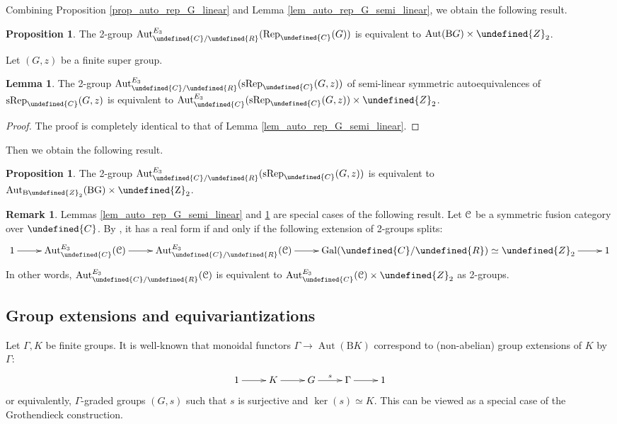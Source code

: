 \documentclass[10pt]{article}
\let\mathbb\undefined
\theoremstyle{definition}
\newtheorem{prop}[thm]{Proposition}
\newtheorem{lem}[thm]{Lemma}
\newtheorem{rem}[thm]{Remark}
\numberwithin{equation}{section}
\numberwithin{thm}{section}
\newcommand{\pf}{\begin{proof}}
\newcommand{\epf}{\end{proof}}
\newcommand{\Cb}{\mathbb{C}}
\newcommand{\Rb}{\mathbb{R}}
\newcommand{\Zb}{\mathbb{Z}}
\newcommand{\CC}{\EuScript{C}}
\newcommand{\rmB}{\mathrm{B}}
\DeclareMathOperator{\Aut}{Aut}
\DeclareMathOperator{\Gal}{Gal}
\newcommand{\rep}{\mathrm{Rep}}
\newcommand{\srep}{\mathrm{sRep}}
\begin{document}
Combining Proposition \ref{prop_auto_rep_G_linear} and Lemma \ref{lem_auto_rep_G_semi_linear}, we obtain the following result.

\begin{prop} \label{prop_auto_rep_G_semi_linear}
The 2-group $\Aut_{\Cb/\Rb}^{E_3}(\rep_\Cb(G))$ is equivalent to $\Aut(\rmB G) \times \Zb_2$.
\end{prop}


Let $(G,z)$ be a finite super group.

\begin{lem} \label{lem_auto_srep_G_z_semi_linear}
The 2-group $\Aut_{\Cb/\Rb}^{E_3}(\srep_\Cb(G,z))$ of semi-linear symmetric autoequivalences of $\srep_\Cb(G,z)$ is equivalent to $\Aut_\Cb^{E_3}(\srep_\Cb(G,z)) \times \Zb_2$.
\end{lem}

\pf
The proof is completely identical to that of Lemma \ref{lem_auto_rep_G_semi_linear}.
\epf

Then we obtain the following result.

\begin{prop} \label{prop_auto_srep_G_z_semi_linear}
The 2-group $\Aut_{\Cb/\Rb}^{E_3}(\srep_\Cb(G,z))$ is equivalent to $\Aut_{\rmB \Zb_2}(\rm B G) \times \Zb_2$.
\end{prop}

\begin{rem}
Lemmas \ref{lem_auto_rep_G_semi_linear} and  \ref{lem_auto_srep_G_z_semi_linear} are special cases of the following result. Let $\CC$ be a symmetric fusion category over $\Cb$. By \cite[Proposition 3.5]{EG11}, it has a real form if and only if the following extension of 2-groups splits:
\[
\xymatrix{
1 \ar[r] & \Aut^{E_3}_\Cb(\CC) \ar[r] & \Aut^{E_3}_{\Cb/\Rb}(\CC) \ar[r] & \Gal(\Cb/\Rb) \simeq \Zb_2 \ar[r] & 1
}
\]
In other words, $\Aut^{E_3}_{\Cb/\Rb}(\CC)$ is equivalent to $\Aut^{E_3}_\Cb(\CC) \times \Zb_2$ as 2-groups.
\end{rem}

\subsection{Group extensions and equivariantizations} \label{sec_extension_equivariantization}

Let $\Gamma,K$ be finite groups. It is well-known that monoidal functors $\Gamma \to \Aut(\rmB K)$ correspond to (non-abelian) group extensions of $K$ by $\Gamma$:
\[
\xymatrix{
1 \ar[r] & K \ar[r] & G \ar[r]^-{s} & \Gamma \ar[r] & 1
}
\]
or equivalently, $\Gamma$-graded groups $(G,s)$ such that $s$ is surjective and $\ker(s) \simeq K$. This can be viewed as a special case of the Grothendieck construction.
\end{document}
